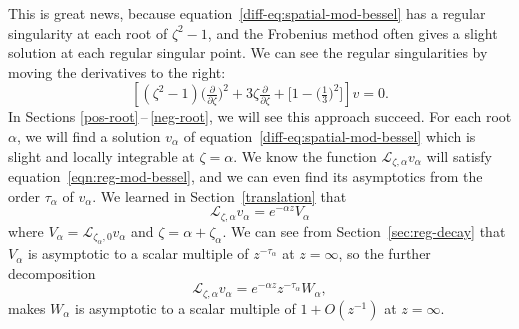 \documentclass{article}
\newcommand{\fracderiv}[3]{\partial^{#1}_{#2, #3}}
\newcommand{\laplace}{\mathcal{L}}
\theoremstyle{definition}
\theoremstyle{plain}
\newenvironment{old}{\color{RoyalBlue}}{\color{black}}
\begin{document}
\begin{old}
This is great news, because equation~\eqref{diff-eq:spatial-mod-bessel} has a regular singularity at each root of $\zeta^2 - 1$, and the Frobenius method often gives a slight solution at each regular singular point. We can see the regular singularities by moving the derivatives to the right:
\[ \left[ (\zeta^2 - 1) \big(\tfrac{\partial}{\partial \zeta}\big)^2 + 3\zeta \tfrac{\partial}{\partial \zeta} + \big[ 1 - \big(\tfrac{1}{3}\big)^2 \big] \right] v = 0. \]
In Sections \ref{pos-root}\,--\,\ref{neg-root}, we will see this approach succeed. For each root $\alpha$, we will find a solution $v_\alpha$ of equation~\eqref{diff-eq:spatial-mod-bessel} which is slight and locally integrable at $\zeta = \alpha$. We know the function $\laplace_{\zeta, \alpha} v_\alpha$ will satisfy equation~\eqref{eqn:reg-mod-bessel}, and we can even find its asymptotics from the order $\tau_\alpha$ of $v_\alpha$. We learned in Section~\ref{translation} that
\[ \laplace_{\zeta, \alpha} v_\alpha = e^{-\alpha z} V_\alpha \]
where $V_\alpha = \laplace_{\zeta_\alpha, 0} v_\alpha$ and $\zeta = \alpha + \zeta_\alpha$. We can see from Section~\ref{sec:reg-decay} that $V_\alpha$ is asymptotic to a scalar multiple of $z^{ - \tau_\alpha}$ at $z = \infty$, so the further decomposition
\[ \laplace_{\zeta, \alpha} v_\alpha = e^{-\alpha z} z^{-\tau_\alpha} W_\alpha, \]
makes $W_\alpha$ is asymptotic to a scalar multiple of $1+O(z^{-1})$ at $z = \infty$.

\end{old}
\end{document}
